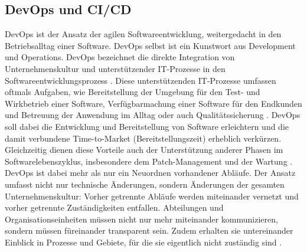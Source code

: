 \subsection{DevOps und CI/CD}
\label{DevOps und CI/CD}
\gls{DevOps} ist der Ansatz der agilen Softwareentwicklung, weitergedacht in den Betriebsalltag einer Software. \gls{DevOps} selbst ist ein Kunstwort aus \glqq{}Development\grqq{} und \glqq{}Operations\grqq{}. \gls{DevOps} bezeichnet die direkte Integration von Unternehmenskultur und unterstützender \acrshort{IT}-Prozesse in den Softwareentwicklungsprozess \cite{halstenberg_devops_2020}. Diese unterstützenden \acrshort{IT}-Prozesse umfassen oftmals Aufgaben, wie Bereitstellung der Umgebung für den Test- und Wirkbetrieb einer Software, Verfügbarmachung einer Software für den Endkunden und Betreuung der Anwendung im Alltag oder auch Qualitätssicherung \cite{DevOps_Definition_AWS}. \gls{DevOps} soll dabei die Entwicklung und Bereitstellung von Software erleichtern und die damit verbundene Time-to-Market (Bereitstellungszeit) erheblich verkürzen. Gleichzeitig dienen diese Vorteile auch der Unterstützung anderer Phasen im Softwarelebenszyklus, insbesondere dem Patch-Management und der Wartung \cite{DevOps_Definition_Microsoft}.\newline
\gls{DevOps} ist dabei mehr als nur ein Neuordnen vorhandener Abläufe. Der Ansatz umfasst nicht nur technische Änderungen, sondern Änderungen der gesamten Unternehmenskultur: Vorher getrennte Abläufe werden miteinander vernetzt und vorher getrennte Zuständigkeiten entfallen. Abteilungen und Organisationseinheiten müssen nicht nur mehr miteinander kommunizieren, sondern müssen füreinander transparent sein. Zudem erhalten sie untereinander Einblick in Prozesse und Gebiete, für die sie eigentlich nicht zuständig sind \cite{DevOps_Definition_Microsoft} \cite{DevOps_Definition_AWS}.\newline
